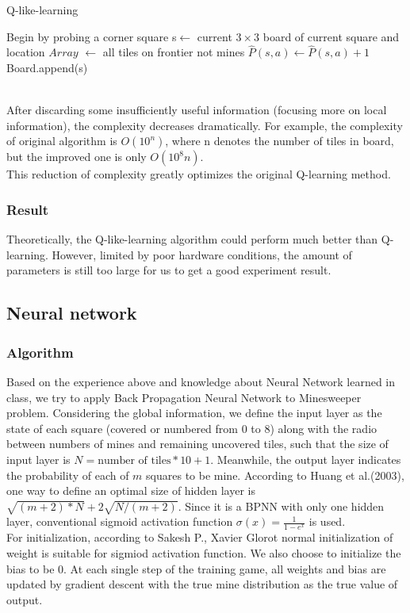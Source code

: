 \documentclass{article}
\begin{document}
\begin{algorithm}[htb] 
	\caption{ Q-like-learning} 
	\label{alg:Framwork} 
	\begin{algorithmic}[1]
		\State Begin by probing a corner square
		\label{code:fram:extract} 
		\label{code:fram:trainbase} 
		\State s$\leftarrow$ current $3\times3$ board of current square and location 
		\State $Array$ $\leftarrow$ all tiles on frontier not mines 
		\label{code:fram:classify} 
		\State$\hat{P}(s,a)\leftarrow\hat{P}(s,a)+1$
		\State Board.append(s)
		\EndWhile	
	\end{algorithmic} 
\end{algorithm}
\\After discarding some insufficiently useful information (focusing more on local information), the complexity decreases dramatically. For example, the complexity of original algorithm is $O(10^{n})$, where n denotes the number of tiles in board, but the improved one is only $O(10^{8}n)$.\\
This reduction of complexity greatly optimizes the original Q-learning method. 
\subsubsection{Result}
Theoretically, the Q-like-learning algorithm could perform much better than Q-learning. However, limited by poor hardware conditions, the amount of parameters is still too large for us to get a good experiment result.
\subsection{Neural network}
\subsubsection{Algorithm}
Based on the experience above and knowledge about Neural Network learned in class, we try to apply Back Propagation Neural Network to Minesweeper problem. Considering the global information, we define the input layer as the state of each square (covered or numbered from 0 to 8) along with the radio between numbers of mines and remaining uncovered tiles, such that the size of input layer is $N=\text{number of tiles}*10+1$. Meanwhile, the output layer indicates the probability of each of $m$ squares to be mine. According to Huang et al.(2003), one way to define an optimal size of hidden layer is $\sqrt{(m+2)*N}+2\sqrt{N/(m+2)}$. Since it is a BPNN with only one hidden layer, conventional sigmoid activation function $\sigma(x)=\frac{1}{1-e^x}$ is used.\\
For initialization, according to Sakesh P., Xavier Glorot normal initialization of weight is suitable for sigmiod activation function. We also choose to initialize the bias to be 0. At each single step of the training game, all weights and bias are updated by gradient descent with the true mine distribution as the true value of output.
\end{document}
